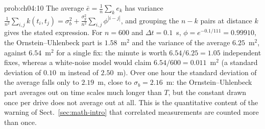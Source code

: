 \begin{sol}{prob:ch04:10}
The average $\bar e=\frac1n\sum_k e_k$ has variance $\frac{1}{n^{2}}\sum_{i,j}k(t_i,t_j)=\sigma_b^{2}+\frac{\sigma_g^{2}}{n^{2}}\sum_{i,j}\phi^{|i-j|}$, and grouping the $n-k$ pairs at distance $k$ gives the stated expression. For $n=600$ and $\Delta t=0.1$~s, $\phi=e^{-0.1/111}=0.99910$, the Ornstein--Uhlenbeck part is $1.58$~m$^{2}$ and the variance of the average $6.25$~m$^{2}$, against $6.54$~m$^{2}$ for a single fix: the minute is worth $6.54/6.25=1.05$ independent fixes, whereas a white-noise model would claim $6.54/600=0.011$~m$^{2}$ (a standard deviation of $0.10$~m instead of $2.50$~m). Over one hour the standard deviation of the average falls only to $2.19$~m, close to $\sigma_b=2.16$~m: the Ornstein--Uhlenbeck part averages out on time scales much longer than $T$, but the constant drawn once per drive does not average out at all. This is the quantitative content of the warning of Sect.~\ref{sec:math-intro} that correlated measurements are counted more than once.
\end{sol}
